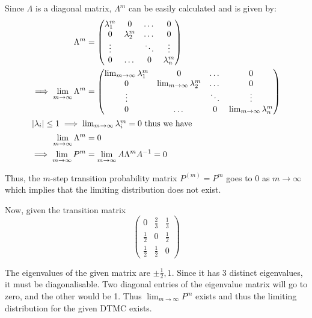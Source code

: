 \documentclass[12pt, oneside]{article}
\begin{document}
\begin{enumerate}
{\begin{enumerate}
{            Since \(\Lambda\) is a diagonal matrix, \(\Lambda^m\) can be easily calculated and is given
            by:
            \begin{align*}
                \Lambda^m &= \begin{pmatrix}
                    \lambda_1^m & 0         & \dots  & 0 \\
                    0         & \lambda_2^m & \dots  & 0 \\
                    \vdots    &           & \ddots & \vdots\\
                    0         & \dots     & 0      & \lambda_n^m
                \end{pmatrix} \\
                \implies \lim_{m \to \infty} \Lambda^m &= \begin{pmatrix}
                    \lim_{m \to \infty}\lambda_1^m & 0         & \dots  & 0 \\
                    0         & \lim_{m \to \infty} \lambda_2^m & \dots  & 0 \\
                    \vdots    &           & \ddots & \vdots\\
                    0         & \dots     & 0      & \lim_{m \to \infty} \lambda_n^m
                \end{pmatrix} \\
                \intertext{\(|\lambda_i| \leq 1 \implies \lim_{m \to \infty}\lambda_i^m = 0\) thus we have}
                \lim_{m \to \infty} \Lambda^m &= 0 \\
                \implies \lim_{m \to \infty} P^m &= \lim_{m \to \infty} A \Lambda^m A^{-1} = 0
            \end{align*}

            Thus, the \(m\)-step transition probability matrix \(P^{(m)} = P^m\) goes to
            0 as \(m \to \infty\) which implies that the limiting distribution does not
            exist.

            Now, given the transition matrix 
            \[\begin{pmatrix}
                0 & \frac{2}{3} & \frac{1}{3} \\
                \frac{1}{2} & 0 & \frac{1}{2} \\
                \frac{1}{2} & \frac{1}{2} & 0
            \end{pmatrix}\]
            
            The eigenvalues of the given matrix are \(\pm \frac{1}{2}, 1\).
            Since it has 3 distinct eigenvalues, it must be diagonalisable.
            Two diagonal entries of the eigenvalue matrix will go to zero, and the other
            would be 1. Thus \(\lim_{m \to \infty} P^m\) exists and thus the limiting 
            distribution for the given DTMC exists.
        }
    \end{enumerate}
}



\end{enumerate}
\end{document}
